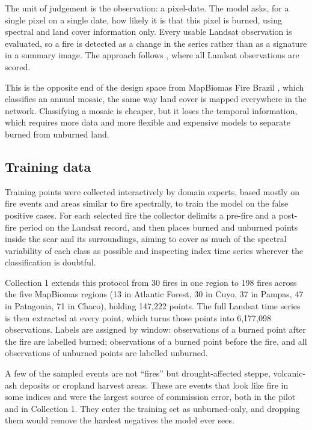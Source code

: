 \documentclass[11pt,a4paper]{article}
\begin{document}
The unit of judgement is the observation: a pixel-date. The model asks, for a single pixel on a
single date, how likely it is that this pixel is burned, using spectral and land cover information only. Every
usable Landsat observation is evaluated, so a fire is detected as a change in the series rather
than as a signature in a summary image. The approach follows \textcite{long2019}, where all
Landsat observations are scored.

This is the opposite end of the design space from MapBiomas Fire Brazil 
\parencite{alencar2022mapbiomas_fire}, which classifies an
annual mosaic, the same way land cover is mapped everywhere in the network. Classifying a mosaic
is cheaper, but it loses the temporal information, which requires more data and more flexible 
and expensive models to separate burned from unburned land.

\subsection{Training data}

Training points were collected interactively by domain experts, based mostly on fire events and 
areas similar to fire spectrally, to train the model on the false positive cases. For each selected
fire the collector delimits a pre-fire and a post-fire period on the Landsat record, and then
places burned and unburned points inside the scar and its surroundings, aiming to cover as much of
the spectral variability of each class as possible and inspecting index time series wherever the
classification is doubtful.

Collection 1 extends this protocol from 30 fires in one region to 198 fires across the five
MapBiomas regions (13 in Atlantic Forest, 30 in Cuyo, 37 in Pampas, 47 in Patagonia, 71 in Chaco), holding
147,222 points. The full Landsat time series is then extracted at every point, which turns those
points into 6,177,098 observations. Labels are assigned by window: observations of a burned point
after the fire are labelled burned; observations of a burned point before the fire, and all
observations of unburned points are labelled unburned.

A few of the sampled events are not \enquote{fires} but
drought-affected steppe, volcanic-ash deposits or cropland harvest areas.
These are events that look like fire in some indices and 
were the largest source of commission error, both in the pilot and in Collection 1. 
They enter the training set
as unburned-only, and dropping them would remove the hardest negatives the model ever sees.
\end{document}
